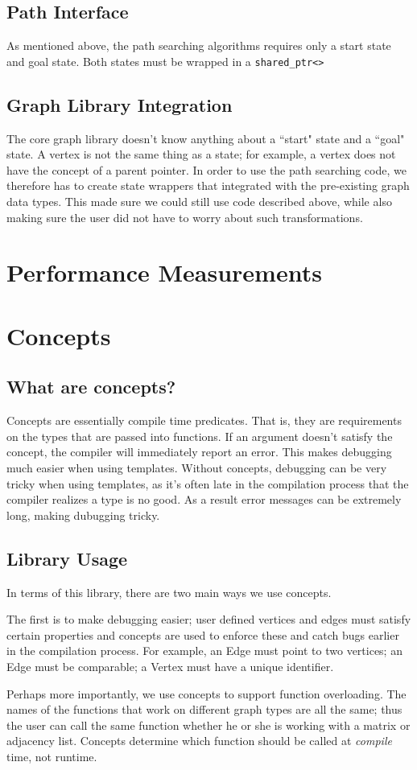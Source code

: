 \documentclass[12pt]{article}
\begin{document}
\subsection{Path Interface}
As mentioned above, the path searching algorithms requires only a start state and goal state. Both states must be wrapped in a \texttt{shared\_ptr<>}

\subsection{Graph Library Integration}
The core graph library doesn't know anything about a ``start" state and a ``goal" state. A vertex is not the same thing as a state; for example, a vertex does not have the concept of a parent pointer. In order to use the path searching code, we therefore has to create state wrappers that integrated with the pre-existing graph data types. This made sure we could still use code described above, while also making sure the user did not have to worry about such transformations.

\section{Performance Measurements}

\section{Concepts}
\subsection{What are concepts?}
Concepts are essentially compile time predicates. That is, they are requirements on the types that are passed into functions. If an argument doesn't satisfy the concept, the compiler will immediately report an error. This makes debugging much easier when using templates. Without concepts, debugging can be very tricky when using templates, as it's often late in the compilation process that the compiler realizes a type is no good. As a result error messages can be extremely long, making dubugging tricky. 
\subsection{Library Usage}
In terms of this library, there are two main ways we use concepts.
\par
The first is to make debugging easier; user defined vertices and edges must satisfy certain properties and concepts are used to enforce these and catch bugs earlier in the compilation process. For example, an Edge must point to two vertices; an Edge must be comparable; a Vertex must have a unique identifier. 
\par
Perhaps more importantly, we use concepts to support function overloading. The names of the functions that work on different graph types are all the same; thus the user can call the same function whether he or she is working with a matrix or adjacency list. Concepts determine which function should be called at \emph{compile} time, not runtime. 
\end{document}
